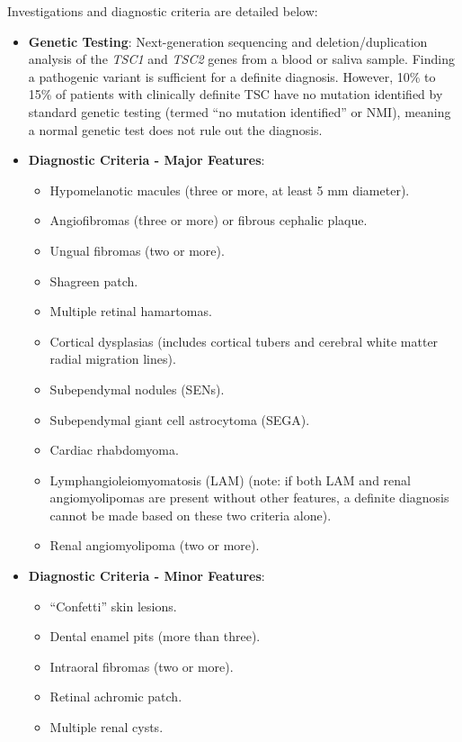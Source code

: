 Investigations and diagnostic criteria are detailed below:
\begin{itemize}
    \item \textbf{Genetic Testing}: Next-generation sequencing and deletion/duplication analysis of the \textit{TSC1} and \textit{TSC2} genes from a blood or saliva sample. Finding a pathogenic variant is sufficient for a definite diagnosis. However, 10\% to 15\% of patients with clinically definite TSC have no mutation identified by standard genetic testing (termed ``no mutation identified'' or NMI), meaning a normal genetic test does not rule out the diagnosis.
    \item \textbf{Diagnostic Criteria - Major Features}:
    \begin{itemize}
        \item Hypomelanotic macules (three or more, at least 5 mm diameter).
        \item Angiofibromas (three or more) or fibrous cephalic plaque.
        \item Ungual fibromas (two or more).
        \item Shagreen patch.
        \item Multiple retinal hamartomas.
        \item Cortical dysplasias (includes cortical tubers and cerebral white matter radial migration lines).
        \item Subependymal nodules (SENs).
        \item Subependymal giant cell astrocytoma (SEGA).
        \item Cardiac rhabdomyoma.
        \item Lymphangioleiomyomatosis (LAM) (note: if both LAM and renal angiomyolipomas are present without other features, a definite diagnosis cannot be made based on these two criteria alone).
        \item Renal angiomyolipoma (two or more).
    \end{itemize}
    \item \textbf{Diagnostic Criteria - Minor Features}:
    \begin{itemize}
        \item ``Confetti'' skin lesions.
        \item Dental enamel pits (more than three).
        \item Intraoral fibromas (two or more).
        \item Retinal achromic patch.
        \item Multiple renal cysts.

\end{itemize}
\end{itemize}
